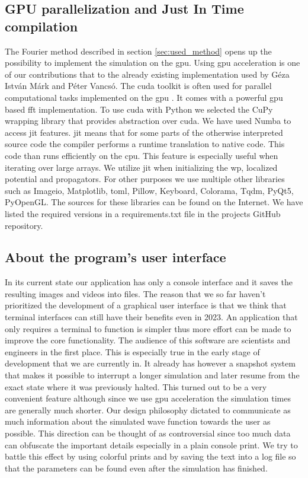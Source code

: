 \subsection{GPU parallelization and Just In Time compilation}

The Fourier method described in section \ref{sec:used_method} opens up the possibility to implement the simulation on the \acrshort{gpu}.
Using \acrshort{gpu} acceleration is one of our contributions that to the already existing implementation used by Géza István Márk and Péter Vancsó.
The \acrfull{cuda} toolkit is often used for parallel computational tasks implemented on the \acrshort{gpu} \cite{cuda2008}.
It comes with a powerful \acrshort{gpu} based \acrshort{fft} implementation.
To use \acrshort{cuda} with Python we selected the CuPy wrapping library \cite{cupy_learningsys2017} that provides abstraction over \acrshort{cuda}.
We have used Numba to access \acrfull{jit} features.
\acrshort{jit} means that for some parts of the otherwise interpreted source code the compiler performs a runtime translation to native code.
This code than runs efficiently on the \acrshort{cpu}.
This feature is especially useful when iterating over large arrays.
We utilize \acrshort{jit} when initializing the \acrshort{wp}, localized potential and propagators.
For other purposes we use multiple other libraries such as Imageio, Matplotlib, toml, Pillow, Keyboard, Colorama, Tqdm, PyQt5, PyOpenGL.
The sources for these libraries can be found on the Internet.
We have listed the required versions in a requirements.txt file in the projects GitHub repository.

\subsection{About the program's user interface}

In its current state our application has only a console interface and it saves the resulting images and videos into files.
The reason that we so far haven't prioritized the development of a graphical user interface is that we think that terminal interfaces can still have their benefits even in 2023.
An application that only requires a terminal to function is simpler thus more effort can be made to improve the core functionality.
The audience of this software are scientists and engineers in the first place.
This is especially true in the early stage of development that we are currently in.
It already has however a snapshot system that makes it possible to interrupt a longer simulation and later resume from the exact state where it was previously halted.
This turned out to be a very convenient feature although since we use \acrshort{gpu} acceleration the simulation times are generally much shorter.
Our design philosophy dictated to communicate as much information about the simulated wave function towards the user as possible.
This direction can be thought of as controversial since too much data can obfuscate the important details especially in a plain console print.
We try to battle this effect by using colorful prints and by saving the text into a log file so that the parameters can be found even after the simulation has finished.

